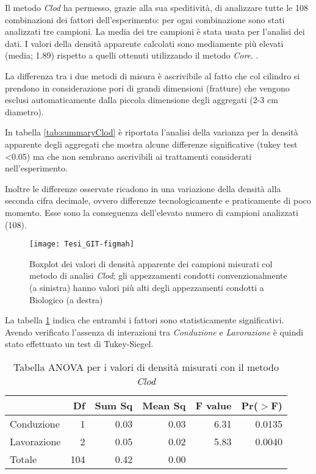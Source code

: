 \documentclass[a4paper]{article}
\begin{document}
Il metodo \emph{Clod} ha permesso, grazie alla sua speditività, di
analizzare tutte le 108 combinazioni dei fattori dell'esperimento: per
ogni combinazione sono stati analizzati tre campioni. La media dei tre
campioni è stata usata per l'analisi dei dati. I valori della densità
apparente calcolati sono mediamente pi\`u elevati (media; 1.89)
rispetto a quelli ottenuti utilizzando il metodo \emph{Core}.
.

La differenza tra i due metodi di misura è ascrivibile al fatto che
col cilindro si prendono in considerazione pori di grandi dimensioni
(fratture) che vengono esclusi automaticamente dalla piccola
dimensione degli aggregati (2-3 cm diametro).


In tabella \ref{tab:summaryClod} \`e riportata l'analisi della
varianza per la densità apparente degli aggregati che mostra alcune
differenze significative (tukey test <0.05) ma che non sembrano
ascrivibili ai trattamenti considerati nell'esperimento.

Inoltre le differenze osservate ricadono in una variazione della
densità alla seconda cifra decimale, ovvero differenze
tecnologicamente e praticamente di poco momento. Esse sono la
conseguenza dell'elevato numero di campioni analizzati (108).



\begin{figure}[ht]
  \centering
\texttt{[image: Tesi\_GIT-figmah]}
\caption[Boxplot dei valori di densità apparente: metodo \emph{Clod}
]{Boxplot dei valori di densità apparente dei campioni misurati col
  metodo di analisi \emph{Clod}; gli appezzamenti condotti
  convenzionalmente (a sinistra) hanno valori più alti degli
  appezzamenti condotti a Biologico (a destra)}
  \label{fig:boxplotClod}

\end{figure}
\FloatBarrier

La tabella \ref{tab:anova piccoli aggregati} indica che entrambi i
fattori sono statisticamente significativi. Avendo verificato
l'assenza di interazioni tra \emph{Conduzione} e \emph{Lavorazione} è
quindi stato effettuato un test di Tukey-Siegel.



\begin{table}[ht]
\centering
\caption{ Tabella ANOVA per i valori di densità misurati con il metodo
  \emph{Clod}}
\label{tab:anova piccoli aggregati}
\begin{tabular}{lrrrrr}
  \hline
 & Df & Sum Sq & Mean Sq & F value & Pr($>$F) \\ 
  \hline
Conduzione & 1 & 0.03 & 0.03 & 6.31 & 0.0135 \\ 
  Lavorazione & 2 & 0.05 & 0.02 & 5.83 & 0.0040 \\ 
  Totale & 104 & 0.42 & 0.00 &  &  \\ 
   \hline
\end{tabular}
\end{table}
\end{document}
